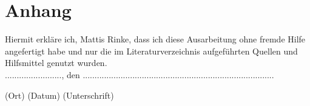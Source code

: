 \documentclass[12pt]{article}
\begin{document}
\newpage
\section{Anhang}

Hiermit erkläre ich, Mattis Rinke, dass ich diese Ausarbeitung ohne fremde Hilfe
angefertigt habe und nur die im Literaturverzeichnis aufgeführten
Quellen und Hilfsmittel genutzt wurden.\\

    ........................, den .................................................................................

\quad\quad  (Ort)    \hfil           (Datum)                   \hfil  (Unterschrift)
\end{document}
